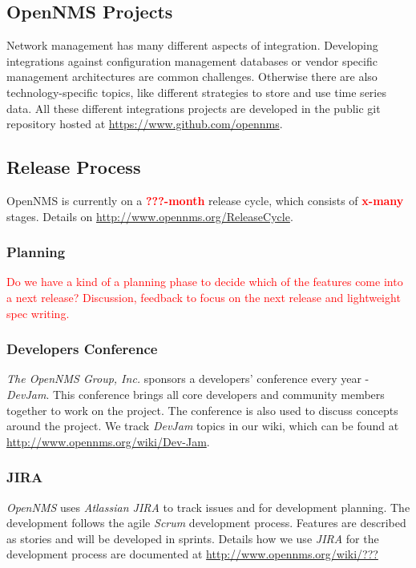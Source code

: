 \subsection{OpenNMS Projects}
Network management has many different aspects of integration. Developing integrations against configuration management databases or vendor specific management architectures are common challenges. Otherwise there are also technology-specific topics, like different strategies to store and use time series data. All these different integrations projects are developed in the public git repository hosted at \url{https://www.github.com/opennms}.

\subsection{Release Process}
OpenNMS is currently on a \textbf{\textcolor{red}{???-month}} release cycle, which consists of \textbf{\textcolor{red}{x-many}} stages. Details on \textcolor{red}{\url{http://www.opennms.org/ReleaseCycle}}.

\subsubsection{Planning}
\textcolor{red}{Do we have a kind of a planning phase to decide which of the features come into a next release? Discussion, feedback to focus on the next release and lightweight spec writing.}

\subsubsection{Developers Conference}
\emph{The OpenNMS Group, Inc.} sponsors a developers' conference every year - \emph{DevJam}. This conference brings all core developers and community members together to work on the project. The conference is also used to discuss concepts around the project. We track \emph{DevJam} topics in our wiki, which can be found at \url{http://www.opennms.org/wiki/Dev-Jam}.

\subsubsection{JIRA}
\emph{OpenNMS} uses \emph{Atlassian JIRA} to track issues and for development planning. The development follows the agile \emph{Scrum} development process. Features are described as stories and will be developed in sprints. Details how we use \emph{JIRA} for the development process are documented at \textcolor{red}{\url{http://www.opennms.org/wiki/???}}

